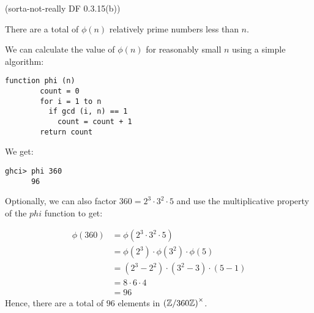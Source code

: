 \begin{problem}{\textsf{(sorta-not-really DF 0.3.15(b))}}
\begin{enumalph}
\begin{Answer}
    \noindent
    There are a total of $\phi(n)$ relatively prime numbers less than $n$.

    \noindent
    We can calculate the value of $\phi(n)$ for reasonably small $n$ using a simple algorithm:

    \begin{Verbatim}[fontsize=\footnotesize, frame=single, framesep=2mm, commandchars=\\\{\}]
      function phi (n)
        count = 0
        for i = 1 to n
          if gcd (i, n) == 1
            count = count + 1
        return count
    \end{Verbatim}
    \noindent
    We get:
    \begin{Verbatim}[fontsize=\footnotesize, frame=single]
      ghci> phi 360
      96
    \end{Verbatim}

    \noindent
    Optionally, we can also factor $360 = 2^3 \cdot 3^2 \cdot 5$ and use the
    multiplicative property of the $phi$ function to get:
    
    \begin{align*}
      \phi(360) &= \phi(2^3 \cdot 3^2 \cdot 5) \\
                &= \phi(2^3) \cdot \phi(3^2) \cdot \phi(5) \\
                &= (2^3 - 2^2) \cdot (3^2 - 3) \cdot (5 - 1) \\
                &= 8 \cdot 6 \cdot 4 \\
                &= 96
    \end{align*}
    Hence, there are a total of $96$ elements in ${(\mathbb{Z}/360\mathbb{Z})}^\times$.
  \end{Answer}
  \end{enumalph}
\end{problem}

